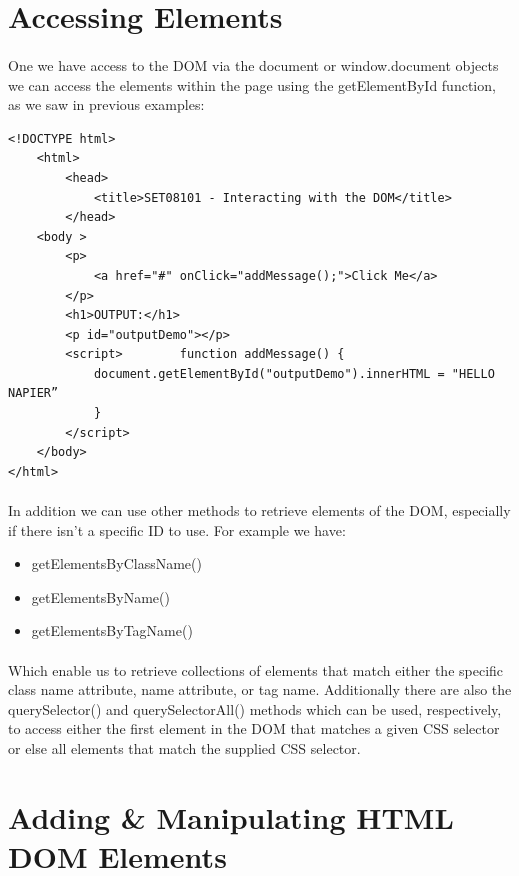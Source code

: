 \section{Accessing Elements}
\paragraph{} One we have access to the DOM via the document or window.document objects we can access the elements within the page using the getElementById function, as we saw in previous examples:

\begin{lstlisting}
<!DOCTYPE html>
	<html> 
		<head>
			<title>SET08101 - Interacting with the DOM</title> 
		</head> 
	<body > 
		<p>
			<a href="#" onClick="addMessage();">Click Me</a>
		</p>
		<h1>OUTPUT:</h1>
		<p id="outputDemo"></p> 
		<script> 		function addMessage() { 
			document.getElementById("outputDemo").innerHTML = "HELLO NAPIER”
			}
		</script> 
	</body> 
</html> 
\end{lstlisting}

\paragraph{} In addition we can use other methods to retrieve elements of the DOM, especially if there isn't a specific ID to use. For example we have:

\begin{itemize}
\item getElementsByClassName()
\item getElementsByName()
\item getElementsByTagName()
\end{itemize}

\paragraph{} Which enable us to retrieve collections of elements that match either the specific class name attribute, name attribute, or tag name. Additionally there are also the querySelector() and querySelectorAll() methods which can be used, respectively, to access either the first element in the DOM that matches a given CSS selector or else all elements that match the supplied CSS selector.


\section{Adding \& Manipulating HTML DOM Elements}
